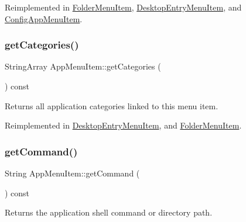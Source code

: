 Reimplemented in \mbox{\hyperlink{classFolderMenuItem_a82ec3210cc211f59b414275dfd60ccb1}{Folder\+Menu\+Item}}, \mbox{\hyperlink{classDesktopEntryMenuItem_a778402e3f98d1a2a64c9f6939b7aef8e}{Desktop\+Entry\+Menu\+Item}}, and \mbox{\hyperlink{classConfigAppMenuItem_a79678785733e59496daabe77c488c1b0}{Config\+App\+Menu\+Item}}.

\mbox{\label{classAppMenuItem_a4d944a13d50b5156d77d0d735c7a0a90}} 
\subsubsection{\texorpdfstring{get\+Categories()}{getCategories()}}
{\footnotesize\ttfamily String\+Array App\+Menu\+Item\+::get\+Categories (\begin{DoxyParamCaption}{ }\end{DoxyParamCaption}) const\hspace{0.3cm}{\ttfamily [virtual]}}

\begin{DoxyReturn}{Returns}
all application categories linked to this menu item. 
\end{DoxyReturn}


Reimplemented in \mbox{\hyperlink{classDesktopEntryMenuItem_a1bf16bd033c09fca27c950d45717c862}{Desktop\+Entry\+Menu\+Item}}, and \mbox{\hyperlink{classFolderMenuItem_ae9026a329e1b9e6111354802624328f5}{Folder\+Menu\+Item}}.

\mbox{\label{classAppMenuItem_ab56357ca864c4cedc9caed1118498670}} 
\subsubsection{\texorpdfstring{get\+Command()}{getCommand()}}
{\footnotesize\ttfamily String App\+Menu\+Item\+::get\+Command (\begin{DoxyParamCaption}{ }\end{DoxyParamCaption}) const\hspace{0.3cm}{\ttfamily [virtual]}}

\begin{DoxyReturn}{Returns}
the application shell command or directory path. 
\end{DoxyReturn}


